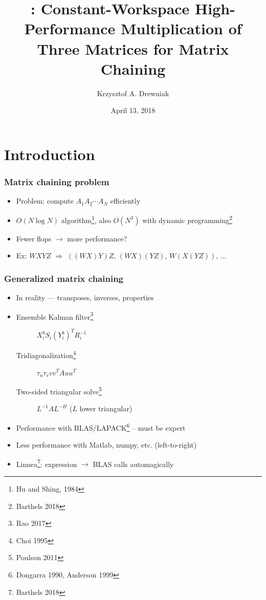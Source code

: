 \documentclass{beamer}
\title[\gemmt{}]{\gemmt{}: Constant-Workspace High-Performance Multiplication of Three Matrices for Matrix Chaining}
\author[Drewniak]{Krzysztof A. Drewniak}
\institute[UT Austin]{The University of Texas at Austin}
\date[]{April 13, 2018}
\begin{document}
\begin{frame}[plain]
  \titlepage{}
\end{frame}

\section[Introduction]{Introduction}


\begin{frame}
  \frametitle{Matrix chaining problem}
  \begin{itemize}
  \item Problem: compute $A_1A_2\cdots A_N$ efficiently
  \item $O(N \log N)$ algorithm\footnote{Hu and Shing, 1984}, also $O(N^3)$ with dynamic programming\footnote{Barthels 2018}
  \item Fewer flops $\to$ more performance?
  \item Ex: $WXYZ$ $\Rightarrow$ $((WX)Y)Z$, $(WX)(YZ)$, $W(X(YZ))$, $\ldots$
  \end{itemize}
\end{frame}

\begin{frame}
  \frametitle{Generalized matrix chaining}
  \begin{itemize}
  \item In reality --- transposes, inverses, properties
  \item
    \begin{description}
    \item[Ensemble Kalman filter\footnote{Rao 2017}] $X_i^b S_i (Y_i^b)^T R_i^{-1}$
    \item[Tridiagonalization\footnote{Choi 1995}] $\tau_u\tau_vvv^TAuu^T$
    \item[Two-sided triangular solve\footnote{Poulson 2011}] $L^{-1}AL^{-H}$ ($L$ lower triangular)
    \end{description}
  \item Performance with BLAS/LAPACK\footnote{Dongarra 1990, Anderson 1999} -- must be expert
  \item Less performance with  Matlab, numpy, etc. (left-to-right)
  \item Linnea\footnote{Barthels 2018}: expression $\to$ BLAS calls automagically
  \end{itemize}
\end{frame}
\end{document}
